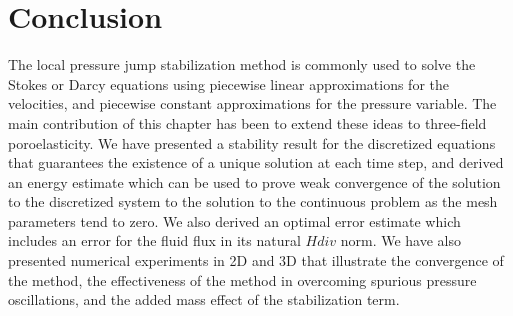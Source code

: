 \section{Conclusion}
The local pressure jump stabilization method \cite{burman2007unified} is commonly used to solve the Stokes or Darcy equations using piecewise linear approximations for the velocities, and piecewise constant approximations for the pressure variable. The main contribution of this chapter has been to extend these ideas to three-field poroelasticity. We have presented a stability result for the discretized equations that guarantees the existence of a unique solution at each time step, and derived an energy estimate which can be used to prove weak convergence of the solution to the discretized system to the solution to the continuous problem as the mesh parameters tend to zero. We also derived an optimal error estimate which includes an error for the fluid flux in its natural $H{div}$ norm. We have also presented numerical experiments in 2D and 3D that illustrate the convergence of the method, the effectiveness of the method in overcoming spurious pressure oscillations, and the added mass effect of the stabilization term.

